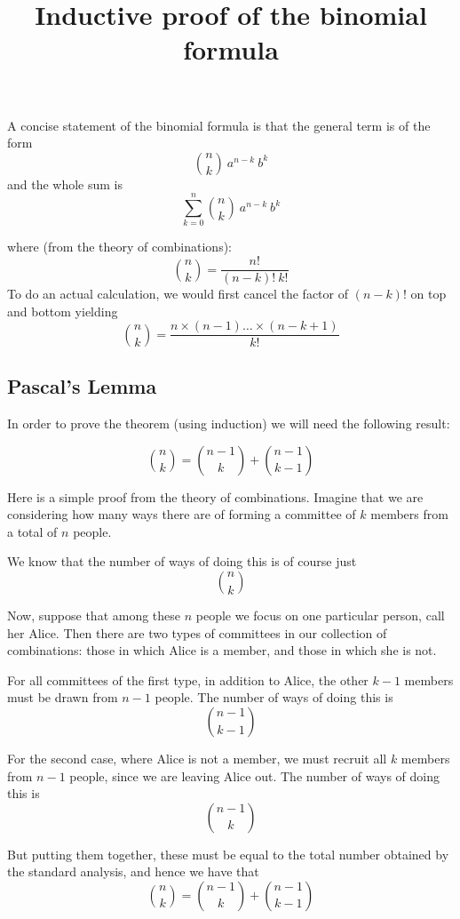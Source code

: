 \documentclass[11pt, oneside]{article}   	%
\title{Inductive proof of the binomial formula}
\date{}							%
\begin{document}
\maketitle
\Large
A concise statement of the binomial formula is that the general term is of the form
\[ {{n}\choose{k}} \ a^{n-k} \ b^k  \]
and the whole sum is
\[ \sum_{k=0}^{n} {{n}\choose{k}} \ a^{n-k} \ b^k  \]

where (from the theory of combinations):
\[  {{n}\choose{k}} = \frac{n!}{(n-k)! \ k!} \]
To do an actual calculation, we would first cancel the factor of $(n-k)!$ on top and bottom yielding
\[  {{n}\choose{k}} = \frac{n \times (n-1) \dots \times (n-k+1)}{k!} \]

\subsection*{Pascal's Lemma}
In order to prove the theorem (using induction) we will need the following result:

\[  {{n}\choose{k}} = {{n-1}\choose{k}} + {{n-1}\choose{k-1}} \]

Here is a simple proof from the theory of combinations.  Imagine that we are considering how many ways there are of forming a committee of $k$ members from a total of $n$ people.

We know that the number of ways of doing this is of course just
\[  {{n}\choose{k}} \]

Now, suppose that among these $n$ people we focus on one particular person, call her Alice.  Then there are two types of committees in our collection of combinations:  those in which Alice is a member, and those in which she is not.

For all committees of the first type, in addition to Alice, the other $k-1$ members must be drawn from $n-1$ people. The number of ways of doing this is
\[  {{n-1}\choose{k-1}} \]

For the second case, where Alice is not a member, we must recruit all $k$ members from $n-1$ people, since we are leaving Alice out.  The number of ways of doing this is
\[  {{n-1}\choose{k}} \]

But putting them together, these must be equal to the total number obtained by the standard analysis, and hence we have that
\[  {{n}\choose{k}} = {{n-1}\choose{k}} + {{n-1}\choose{k-1}} \]
\end{document}
